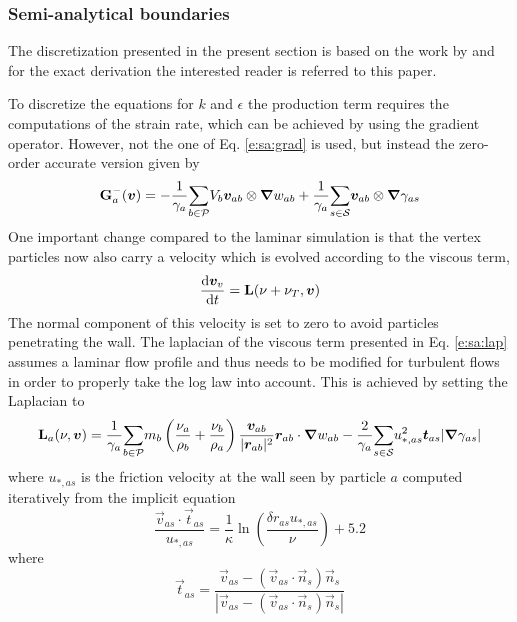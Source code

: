\subsubsection{Semi-analytical boundaries}
The discretization presented in the present section is based on the work
by \cite{leroy_unified_2014} and for the exact derivation the interested
reader is referred to this paper.

To discretize the equations for $k$ and $\epsilon$ the production term
requires the computations of the strain rate, which can be achieved by
using the gradient operator. However, not the one of Eq.
\eqref{e:sa:grad} is used, but instead the zero-order accurate version
given by
\begin{equation}
\textbf{G}^-_a(\bm{v}) = - \frac{1}{\gamma_a}\underset{b \in \mathcal{P}}{\sum} V_b \bm{v}_{ab} \otimes \bm{\nabla} w_{ab}
 +\frac{1}{\gamma_a}\underset{s \in \mathcal{S}}{\sum} \bm{v}_{ab} \otimes \bm{\nabla} \gamma_{as}
\label{e:turb:grad-}
\end{equation}
One important change compared to the laminar simulation is that the
vertex particles now also carry a velocity which is evolved according to
the viscous term, \ie
\begin{equation}
\frac{\text{d} \bm{v}_v}{\text{d} t} = \textbf{L}(\nu + \nu_T, \bm{v})
\label{e:turb:vert-vel}
\end{equation}
The normal component of this velocity is set to zero to avoid particles
penetrating the wall. The laplacian of the viscous term presented in Eq.
\eqref{e:sa:lap} assumes a laminar flow profile and thus needs to be
modified for turbulent flows in order to properly take the log law into
account. This is achieved by setting the Laplacian to
\begin{equation}
\textbf{L}_a(\nu, \bm{v}) = \frac{1}{\gamma_a}\underset{b \in \mathcal{P}}{\sum} m_b \left(\frac{\nu_a}{\rho_b} + \frac{\nu_b}{\rho_a}\right) \frac{\bm{v}_{ab}}{|\bm{r}_{ab}|^2}\bm{r}_{ab}\cdot \bm{\nabla} w_{ab}
 - \frac{2}{\gamma_a} \underset{s \in \mathcal{S}}{\sum} u_{*,as}^2 \bm{t}_{as} |\bm{\nabla} \gamma_{as}|
\label{e:turb:lap}
\end{equation}
where $u_{*,as}$ is the friction velocity at the wall seen by particle
$a$ computed iteratively from the implicit equation
\begin{equation}
\frac{\vec{v}_{as}\cdot\vec{t}_{as}}{u_{*,as}} =
\frac{1}{\kappa}\ln\left( \frac{\delta r_{as} u_{*,as}}{\nu} \right) +
5.2
\label{e:turb:fric-vel}
\end{equation}
where
\begin{equation}
\vec{t}_{as} = \frac{\vec{v}_{as} -
(\vec{v}_{as}\cdot\vec{n}_s)\vec{n}_s}{|\vec{v}_{as} -
(\vec{v}_{as}\cdot\vec{n}_s)\vec{n}_s|}
\label{e:turb:tas}
\end{equation}
